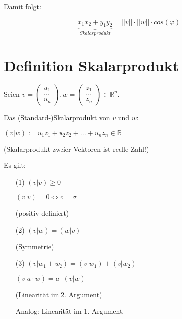 \documentclass[a4paper, openany]{book}
\begin{document}
        Damit folgt:

        \begin{equation}
          \underbrace{x_1x_2 + y_1y_2}_{Skalarprodukt} = ||v|| \cdot ||w|| \cdot cos(\varphi)
        \end{equation}

        \section{Definition Skalarprodukt}

        Seien $v = \begin{pmatrix}u_1 \\ ... \\ u_n \end{pmatrix}, w = \begin{pmatrix}z_1 \\ ... \\ z_n \end{pmatrix} \in \mathbb{R}^n$.

        \par \medskip

        Das \underline{(Standard-)Skalarprodukt} von $v$ und $w$:

        \begin{center}
          $(v|w) :=u_1z_1 + u_2z_2 + ... + u_nz_n \in \mathbb{R}$
        \end{center}

        (Skalarprodukt zweier Vektoren ist reelle Zahl!)

        \par \medskip

        Es gilt:

        \begin{itemize}
          \item[(1)] $(v|v) \ge 0$

          $(v|v) = 0 \Leftrightarrow v = \sigma$

          (positiv definiert)

          \item[(2)] $(v|w) = (w|v)$

          (Symmetrie)

          \item[(3)] $(v|w_1 + w_2) = (v | w_1) + (v | w_2)$

          $(v|a \cdot w) = a \cdot (v|w)$

          (Linearität im 2. Argument)

          Analog: Linearität im 1. Argument.

        \end{itemize}
\end{document}

